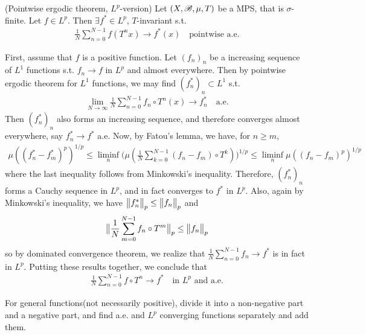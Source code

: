 \documentclass[12pt,a4paper]{report}
\newenvironment{proof}
{\begin{changemargin}{1cm}{0.5cm} 
	}%
	{\end{changemargin}
}
\begin{document}
\thm (Pointwise ergodic theorem, $L^p$-version) Let $(X,\mathscr{B}, \mu, T)$ be a MPS, that is $\sigma$-finite. Let $f\in L^p$. Then $\exists f^* \in L^p$, $T$-invariant s.t.
\begin{align*}
\frac{1}{N} \sum_{n=0}^{N-1} f(T^n x) \rightarrow f^* (x) \quad \text{pointwise a.e.}
\end{align*}
\begin{proof}
\pf First, assume that $f$ is a positive function. Let $(f_n)_n$ be a increasing sequence of $L^1$ functions s.t. $f_n \rightarrow f$ in $L^p$ and almost everywhere. Then by pointwise ergodic theorem for $L^1$ functions, we may find $(f^*_n)_n \subset L^1$ s.t.
\begin{align*}
\lim_{N\rightarrow \infty }\frac{1}{N} \sum_{n=0}^{N-1} f_n \circ T^n (x) \rightarrow f^*_n \quad \text{a.e.}
\end{align*}
Then $(f^*_n)_n$ also forms an increasing sequence, and therefore converges almost everywhere, say $f^*_n \rightarrow f^*$ a.e. Now, by Fatou's lemma, we have, for $n\geq m$,
\begin{align*}
\mu( (f^*_n - f^*_m)^{p} )^{1/p} \leq \liminf_{n} \Big( \mu( \frac{1}{N} \sum_{k=0}^{N-1} (f_n - f_m)  \circ T^k )  \Big)^{1/p} \leq \liminf_n \mu((f_n-f_m)^p)^{1/p}
\end{align*}
where the last inequality follows from Minkowski's inequality. Therefore, $(f^*_n)_n$ forms a Cauchy sequence in $L^p$, and in fact converges to $f^*$ in $L^p$. Also, again by Minkowski's inequality, we have $\bigl\lVert f^*_n\bigr\rVert_{p} \leq \bigl\lVert f_n\bigr\rVert_{p}$ and 
\begin{align*}
\bigl\lVert\frac{1}{N} \sum_{m=0}^{N-1} f_n \circ T^m\bigr\rVert_{p} \leq \bigl\lVert f_n\bigr\rVert_{p}
\end{align*}
so by dominated convergence theorem, we realize that $\frac{1}{N} \sum_{n=0}^{N-1} f_n \rightarrow f^*$ is in fact in $L^p$. Putting these results together, we conclude that
\begin{align*}
\frac{1}{N} \sum_{n=0}^{N-1} f \circ T^n \rightarrow f^* \quad \text{in } L^p \text{ and a.e.}
\end{align*}


\begin{center}
\begin{large}
\end{large}
\end{center}

\quad For general functions(not necessarily positive), divide it into a non-negative part and a negative part, and find a.e. and $L^p$ converging functions separately and add them.
\end{proof}
\end{document}
